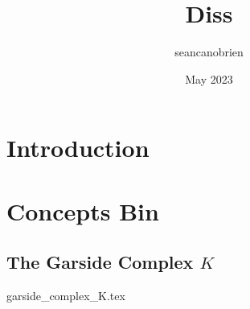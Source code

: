 \documentclass{article}
\title{Diss}
\author{seancanobrien }
\date{May 2023}
\begin{document}
\maketitle

\section{Introduction}

\section{Concepts Bin}
\subsection{The Garside Complex $K$}
{garside_complex_K.tex}
\end{document}
